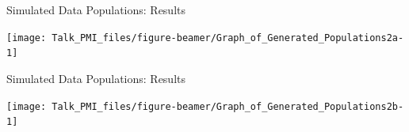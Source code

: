 \documentclass[ignorenonframetext,]{beamer}
\begin{document}
\begin{frame}{Simulated Data Populations: Results}
\protect\hypertarget{simulated-data-populations-results}{}

\begin{center}\texttt{[image: Talk\_PMI\_files/figure-beamer/Graph\_of\_Generated\_Populations2a-1]} \end{center}

\end{frame}

\begin{frame}{Simulated Data Populations: Results}
\protect\hypertarget{simulated-data-populations-results-1}{}

\begin{center}\texttt{[image: Talk\_PMI\_files/figure-beamer/Graph\_of\_Generated\_Populations2b-1]} \end{center}

\end{frame}
\end{document}
